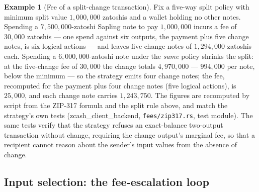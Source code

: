 \documentclass[11pt,a4paper]{article}
\theoremstyle{definition}
\newtheorem{example}[theorem]{Example}
\begin{document}
\begin{example}[Fee of a split-change transaction]\label{ex:split-fee}
Fix a five-way split policy with minimum split value $1{,}000{,}000$
zatoshis and a wallet holding no other notes. Spending a
$7{,}500{,}000$-zatoshi Sapling note to pay $1{,}000{,}000$ incurs a fee
of $30{,}000$ zatoshis --- one spend against six outputs, the payment
plus five change notes, is six logical actions --- and leaves five
change notes of $1{,}294{,}000$ zatoshis each. Spending a
$6{,}000{,}000$-zatoshi note under the \emph{same} policy shrinks the
split: at the five-change fee of $30{,}000$ the change totals
$4{,}970{,}000$ --- $994{,}000$ per note, below the minimum --- so the
strategy emits four change notes; the fee, recomputed for the payment
plus four change notes (five logical actions), is $25{,}000$, and each
change note carries $1{,}243{,}750$. The figures are recomputed by
script from the ZIP-317 formula and the split rule above, and match the
strategy's own tests (\textsf{zcash\_client\_backend},
\texttt{fees/zip317.rs}, test module). The same tests verify that the
strategy refuses an exact-balance two-output transaction without change,
requiring the change output's marginal fee, so that a recipient cannot
reason about the sender's input values from the absence of change.
\end{example}

\subsection{Input selection: the fee-escalation loop}\label{sec:fees-selection}
\end{document}
